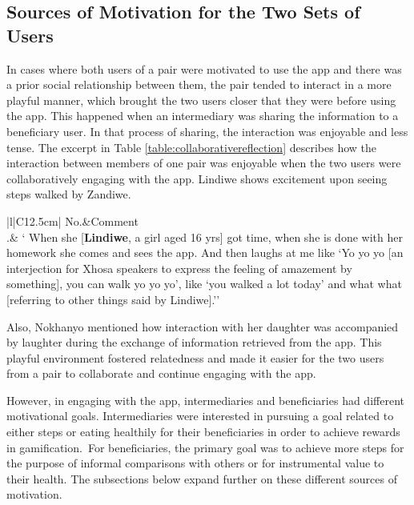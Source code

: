 \subsection{Sources of Motivation for the Two Sets of Users}
In cases where both users of a pair were motivated to use the app and there was a prior social relationship between them, the pair tended to interact in a more playful manner, which brought the two users closer that they were before using the app. This happened when an intermediary was sharing the information to a beneficiary user. In that process of sharing, the interaction was enjoyable and less tense. The excerpt in Table \ref{table:collaborativereflection} describes how the interaction  between members of one pair was enjoyable when the two users were collaboratively engaging with the app. Lindiwe shows excitement upon seeing steps walked by Zandiwe. 

\begin{table}[h!]
\renewcommand{\baselinestretch}{1.5}
  \begin{center}
    \caption{Excerpt: an example of how collaborative reflection enhanced engagement.}
    \label{table:collaborativereflection}
	\begin{tabular}{|l|C{12.5cm}|}
		\hline
		No.&Comment\\
		.& {` When she [\textbf{Lindiwe}, a girl aged 16 yrs] got time, when she is done with her homework she comes and sees the app. And then laughs at me like `Yo yo yo [an interjection for Xhosa speakers to express the feeling of amazement by something], you can walk yo yo yo', like `you walked a lot today' and what what [referring to other things said by Lindiwe].''}\\
		\hline
	\end{tabular}
  \end{center}
\end{table}

Also, Nokhanyo mentioned how interaction with her daughter was accompanied by laughter during the exchange of information retrieved from the app. This playful environment fostered relatedness and made it easier for the two users from a pair to collaborate and continue engaging with the app. 

However, in engaging with the app, intermediaries and beneficiaries had different motivational goals. Intermediaries were interested in pursuing a goal related to either steps or eating healthily for their beneficiaries in order to achieve rewards in gamification.~For beneficiaries, the primary goal was to achieve more steps for the purpose of informal comparisons with others or for instrumental value to their health. The subsections below expand further on these different sources of motivation.
